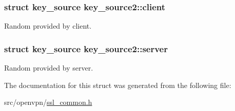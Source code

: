 \subsubsection[{client}]{\setlength{\rightskip}{0pt plus 5cm}struct {\bf key\+\_\+source} key\+\_\+source2\+::client}\label{structkey__source2_a4d6c8db43f190a5760d47f02898e7482}
Random provided by client. \hypertarget{structkey__source2_aae3e8fb55b454ca2a4f3f2ef96b020d4}{}
\subsubsection[{server}]{\setlength{\rightskip}{0pt plus 5cm}struct {\bf key\+\_\+source} key\+\_\+source2\+::server}\label{structkey__source2_aae3e8fb55b454ca2a4f3f2ef96b020d4}
Random provided by server. 

The documentation for this struct was generated from the following file\+:\begin{DoxyCompactItemize}
\item 
src/openvpn/\hyperlink{ssl__common_8h}{ssl\+\_\+common.\+h}\end{DoxyCompactItemize}
